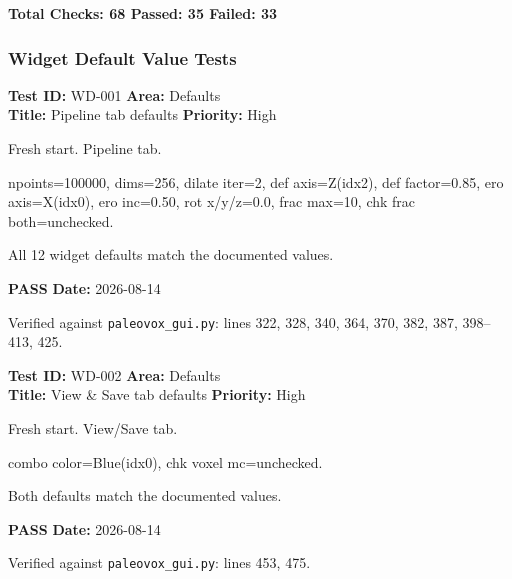 \documentclass[12pt,a4paper]{article}
\newcommand{\pass}{\textcolor{paleogreen}{\textbf{PASS}}}
\newcommand{\testheader}[4]{%
  \smallskip
  \noindent\textbf{Test ID:} #1 \hfill \textbf{Area:} #2 \\
  \textbf{Title:} #3 \hfill \textbf{Priority:} #4
}
\newenvironment{testbody}{%
  \begin{description}[leftmargin=2em,style=nextline]
}{%
  \end{description}
  \smallskip
}
\begin{document}
\begin{center}
\large\textbf{Total Checks: 68 \hspace{1em} Passed: 35 \hspace{1em} Failed: 33}
\end{center}

\newpage

\subsubsection{Widget Default Value Tests}

\testheader{WD-001}{Defaults}{Pipeline tab defaults}{High}
\begin{testbody}
  \item[\textbf{Preconditions:}] Fresh start. Pipeline tab.
  \item[\textbf{Steps:}] npoints=100000, dims=256, dilate iter=2,
        def axis=Z(idx2), def factor=0.85, ero axis=X(idx0), ero inc=0.50,
        rot x/y/z=0.0, frac max=10, chk frac both=unchecked.
  \item[\textbf{Expected Result:}] All 12 widget defaults match the documented
        values.
  \item[\textbf{Status:}] \pass{} \hspace{1em} \textbf{Date:} 2026-08-14
  \item[\textbf{Notes:}] Verified against \texttt{paleovox\_gui.py}: lines 322,
        328, 340, 364, 370, 382, 387, 398--413, 425.
\end{testbody}

\testheader{WD-002}{Defaults}{View \& Save tab defaults}{High}
\begin{testbody}
  \item[\textbf{Preconditions:}] Fresh start. View/Save tab.
  \item[\textbf{Steps:}] combo color=Blue(idx0), chk voxel mc=unchecked.
  \item[\textbf{Expected Result:}] Both defaults match the documented values.
  \item[\textbf{Status:}] \pass{} \hspace{1em} \textbf{Date:} 2026-08-14
  \item[\textbf{Notes:}] Verified against \texttt{paleovox\_gui.py}: lines 453,
        475.
\end{testbody}
\end{document}
